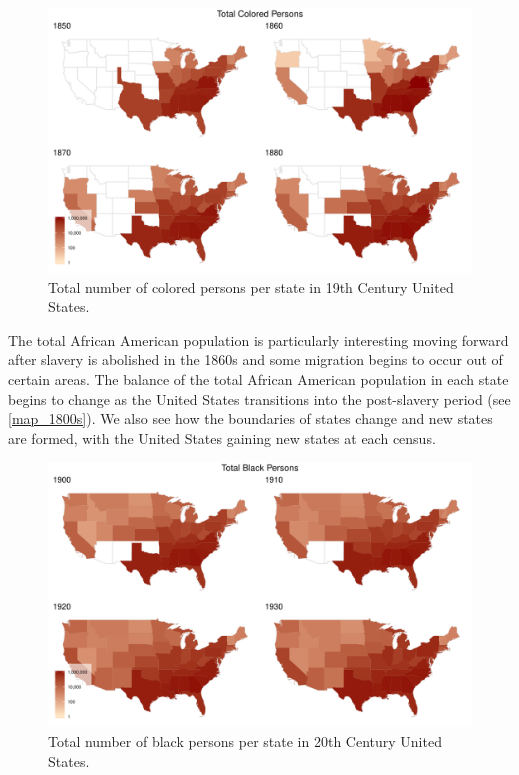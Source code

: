 \documentclass[DIV=calc, paper=a4, fontsize=10pt, twocolumn]{scrartcl}\usepackage[]{graphicx}\usepackage[]{color}
\newenvironment{knitrout}{}{} %
\begin{document}
\begin{knitrout}
\color{fgcolor}\begin{figure}[h]
\includegraphics[width=.5\textwidth]{figure/map_1800s-1} \caption[Total number of colored persons per state in 19th Century United States]{Total number of colored persons per state in 19th Century United States.}\label{fig:map_1800s}
\end{figure}


\end{knitrout}

The total African American population is particularly interesting moving forward after slavery is abolished in the 1860s and some migration begins to occur out of certain areas. The balance of the total African American population in each state begins to change as the United States transitions into the post-slavery period (see \autoref{map_1800s}). We also see how the boundaries of states change and new states are formed, with the United States gaining new states at each census.

\begin{knitrout}
\color{fgcolor}\begin{figure}[h]
\includegraphics[width=.5\textwidth]{figure/map_1900s-1} \caption[Total number of black persons per state in 20th Century United States]{Total number of black persons per state in 20th Century United States.}\label{fig:map_1900s}
\end{figure}


\end{knitrout}
\end{document}
